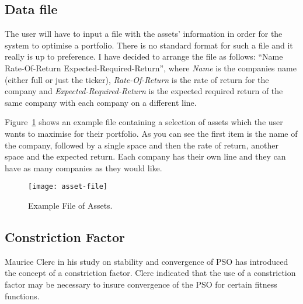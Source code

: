     \subsection{Data file} %
    \label{sub:data_file}
    The user will have to input a file with the assets' information in order for the system to optimise a portfolio. There is no standard format for such a file and it really is up to preference. I have decided to arrange the file as follows: ``Name Rate-Of-Return Expected-Required-Return'', where \textit{Name} is the companies name (either full or just the ticker), \textit{Rate-Of-Return} is the rate of return for the company and \textit{Expected-Required-Return} is the expected required return of the same company with each company on a different line. 

    Figure~\ref{fig:asset_file} shows an example file containing a selection of assets which the user wants to maximise for their portfolio. As you can see the first item is the name of the company, followed by a single space and then the rate of return, another space and the expected return. Each company has their own line and they can have as many companies as they would like. 
    \begin{figure}[H]
      \centering
        \texttt{[image: asset-file]}
      \caption{Example File of Assets.}
      \label{fig:asset_file}
    \end{figure}
    
    \subsection{Constriction Factor} %
    \label{sub:constriction_factor}
    Maurice Clerc in his study on stability and convergence of PSO \cite{constriction_factor} has introduced the concept of a constriction factor. Clerc indicated that the use of a constriction factor may be necessary to insure convergence of the PSO for certain fitness functions.

